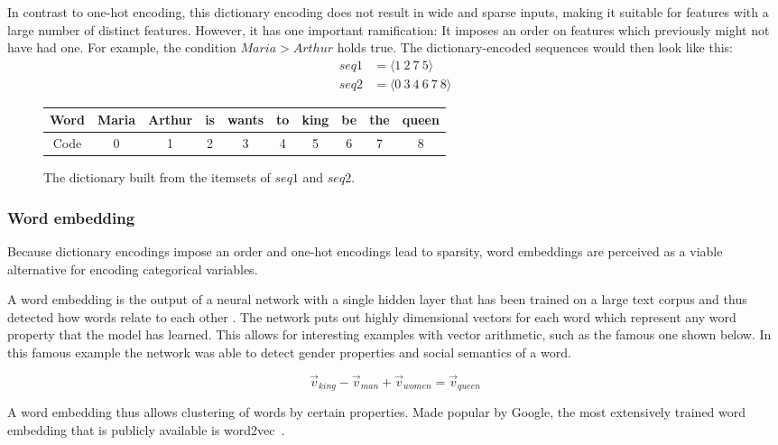 In contrast to one-hot encoding, this dictionary encoding does not result in wide and sparse inputs, making it suitable for features with a large number of distinct features. However, it has one important ramification: It imposes an order on features which previously might not have had one. For example, the condition $Maria > Arthur$ holds true. The dictionary-encoded sequences would then look like this:
\begin{equation*}
    \begin{split}
        seq1 &= \langle1\ 2\ 7\ 5\rangle\\
        seq2 &= \langle0\ 3\ 4\ 6\ 7\ 8\rangle
    \end{split}
\end{equation*}

\begin{figure}
    \centering
    \begin{tabular}{c|ccccccccc}
        Word & Maria & Arthur & is & wants & to & king & be & the & queen\\
        \hline
        Code & 0 & 1 & 2 & 3 & 4 & 5 & 6 & 7 & 8
    \end{tabular}
    \caption{The dictionary built from the itemsets of $seq1$ and $seq2$.}
    \label{tab:dictionary-encoding}
\end{figure}

\subsubsection*{Word embedding}
Because dictionary encodings impose an order and one-hot encodings lead to sparsity, word embeddings are perceived as a viable alternative for encoding categorical variables.

A word embedding is the output of a neural network with a single hidden layer that has been trained on a large text corpus and thus detected how words relate to each other \cite{web:word-embedding}. The network puts out highly dimensional vectors for each word which represent any word property that the model has learned. This allows for interesting examples with vector arithmetic, such as the famous one shown below. In this famous example the network was able to detect gender properties and social semantics of a word. 

$$
    \vec{v}_{king} - \vec{v}_{man} + \vec{v}_{women} = \vec{v}_{queen}
$$

A word embedding thus allows clustering of words by certain properties.
Made popular by Google, the most extensively trained word embedding that is publicly available is word2vec~\cite{web:ahogrammer, goldberg2014word2vec}.


